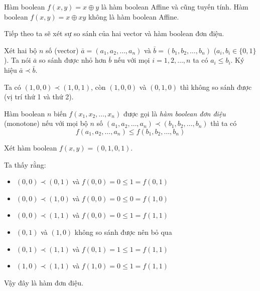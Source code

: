 \begin{example}
    Hàm boolean $f(x, y) = x \oplus y$ là hàm boolean Affine và
    cũng tuyến tính. Hàm boolean $f(x, y) = x \oplus xy$ không là 
    hàm boolean Affine.
\end{example}

Tiếp theo ta sẽ xét sự so sánh của hai vector và 
hàm boolean đơn điệu.

\begin{definition}
    Xét hai bộ $n$ số (vector) $\bar{a} = (a_1, a_2, \ldots, a_n)$ 
    và $\bar{b} = (b_1, b_2, \ldots, b_n)$ ($a_i, b_i \in \{0, 1\}$). 
    Ta nói $\bar{a}$ so 
    sánh được nhỏ hơn $\bar{b}$ nếu với mọi $i = 1, 2, \ldots, n$
    ta có $a_i \leq b_i$. Ký hiệu $\bar{a} \prec \bar{b}$.
\end{definition}

\begin{example}
    Ta có $(1, 0, 0) \prec (1, 0, 1)$, còn $(1, 0, 0)$ và $(0, 1, 0)$
    thì không so sánh được (vị trí thứ 1 và thứ 2).
\end{example}

\begin{definition}
    Hàm boolean $n$ biến $f(x_1, x_2, \ldots, x_n)$ được gọi là
    \textit{hàm boolean đơn điệu} (monotone) nếu với mọi bộ $n$ số
    $(a_1, a_2, \ldots, a_n) \prec (b_1, b_2, \ldots, b_n)$
    thì ta có 
    \begin{equation}
        f(a_1, a_2, \ldots, a_n) \leq f(b_1, b_2, \ldots, b_n)  
    \end{equation}
\end{definition}

\begin{example}
    Xét hàm boolean $f(x, y) = (0, 1, 0, 1)$.

    Ta thấy rằng:
    \begin{itemize}
        \item $(0, 0) \prec (0, 1)$ và $f(0, 0) = 0 \leq 1 = f(0, 1)$
        \item $(0, 0) \prec (1, 0)$ và $f(0, 0) = 0 \leq 0 = f(1, 0)$
        \item $(0, 0) \prec (1, 1)$ và $f(0, 0) = 0 \leq 1 = f(1, 1)$
        \item $(0, 1)$ và $(1, 0)$ không so sánh được nên bỏ qua
        \item $(0, 1) \prec (1, 1)$ và $f(0, 1) = 1 \leq 1 = f(1, 1)$
        \item $(1, 0) \prec (1, 1)$ và $f(1, 0) = 0 \leq 1 = f(1, 1)$
    \end{itemize}

    Vậy đây là hàm đơn điệu.
\end{example}

